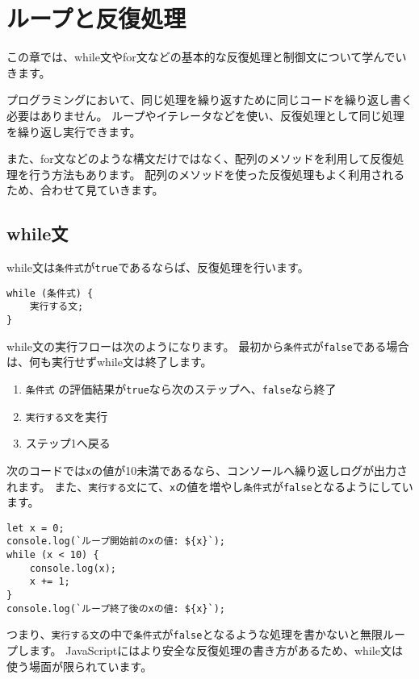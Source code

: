 \hypertarget{loop-and-iteration}{%
\chapter{ループと反復処理}\label{loop-and-iteration}}

この章では、while文やfor文などの基本的な反復処理と制御文について学んでいきます。

プログラミングにおいて、同じ処理を繰り返すために同じコードを繰り返し書く必要はありません。
ループやイテレータなどを使い、反復処理として同じ処理を繰り返し実行できます。

また、for文などのような構文だけではなく、配列のメソッドを利用して反復処理を行う方法もあります。
配列のメソッドを使った反復処理もよく利用されるため、合わせて見ていきます。

\hypertarget{while-statement}{%
\section{while文}\label{while-statement}}

while文は\texttt{条件式}が\texttt{true}であるならば、反復処理を行います。

\begin{lstlisting}
while (条件式) {
    実行する文;
}
\end{lstlisting}

while文の実行フローは次のようになります。
最初から\texttt{条件式}が\texttt{false}である場合は、何も実行せずwhile文は終了します。

\begin{enumerate}
\def\labelenumi{\arabic{enumi}.}
\item
  \texttt{条件式}
  の評価結果が\texttt{true}なら次のステップへ、\texttt{false}なら終了
\item
  \texttt{実行する文}を実行
\item
  ステップ1へ戻る
\end{enumerate}

次のコードでは\texttt{x}の値が10未満であるなら、コンソールへ繰り返しログが出力されます。
また、\texttt{実行する文}にて、\texttt{x}の値を増やし\texttt{条件式}が\texttt{false}となるようにしています。

\begin{lstlisting}
let x = 0;
console.log(`ループ開始前のxの値: ${x}`);
while (x < 10) {
    console.log(x);
    x += 1;
}
console.log(`ループ終了後のxの値: ${x}`);
\end{lstlisting}

つまり、\texttt{実行する文}の中で\texttt{条件式}が\texttt{false}となるような処理を書かないと無限ループします。
JavaScriptにはより安全な反復処理の書き方があるため、while文は使う場面が限られています。

